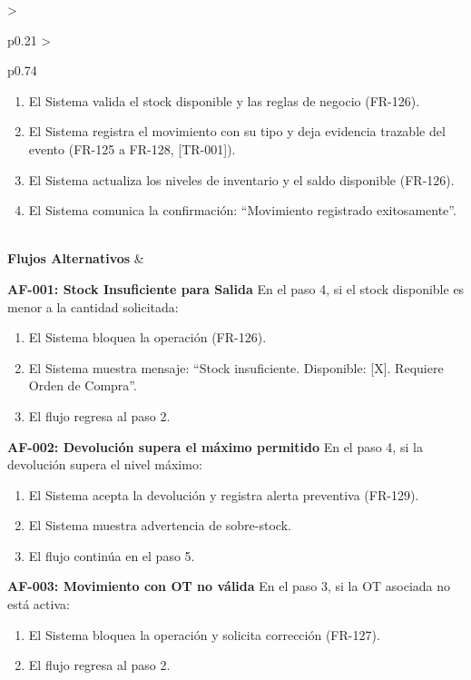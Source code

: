 \begin{longtable}{>{\raggedright\arraybackslash}p{0.21\textwidth} >{\raggedright\arraybackslash}p{0.74\textwidth}}
{\begin{enumerate}[leftmargin=1.5em, nosep, topsep=0pt]
\item El Sistema valida el stock disponible y las reglas de negocio (FR-126).
\item El Sistema registra el movimiento con su tipo y deja evidencia trazable del evento (FR-125 a FR-128, [TR-001]).
\item El Sistema actualiza los niveles de inventario y el saldo disponible (FR-126).
\item El Sistema comunica la confirmación: ``Movimiento registrado exitosamente''.
\end{enumerate} \vspace{2pt}} \\
\textbf{Flujos Alternativos} & \parbox[t]{\linewidth}{\vspace{2pt} \vspace{4pt}\noindent\textbf{AF-001: Stock Insuficiente para Salida}
\newline
En el paso 4, si el stock disponible es menor a la cantidad solicitada:
\begin{enumerate}[leftmargin=1.5em, nosep, topsep=0pt]
\item El Sistema bloquea la operación (FR-126).
\item El Sistema muestra mensaje: ``Stock insuficiente. Disponible: [X]. Requiere Orden de Compra''.
\item El flujo regresa al paso 2.
\end{enumerate}
\vspace{4pt}\noindent\textbf{AF-002: Devolución supera el máximo permitido}
\newline
En el paso 4, si la devolución supera el nivel máximo:
\begin{enumerate}[leftmargin=1.5em, nosep, topsep=0pt]
\item El Sistema acepta la devolución y registra alerta preventiva (FR-129).
\item El Sistema muestra advertencia de sobre-stock.
\item El flujo continúa en el paso 5.
\end{enumerate}
\vspace{4pt}\noindent\textbf{AF-003: Movimiento con OT no válida}
\newline
En el paso 3, si la OT asociada no está activa:
\begin{enumerate}[leftmargin=1.5em, nosep, topsep=0pt]
\item El Sistema bloquea la operación y solicita corrección (FR-127).
\item El flujo regresa al paso 2.

\end{enumerate}}
\end{longtable}
